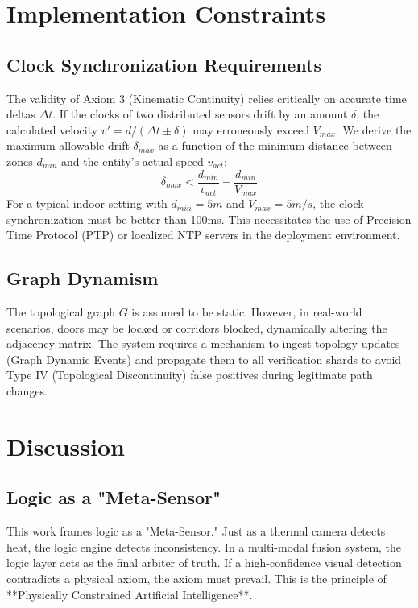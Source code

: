 \documentclass[conference]{IEEEtran}
\begin{document}
\section{Implementation Constraints}

\subsection{Clock Synchronization Requirements}
The validity of Axiom 3 (Kinematic Continuity) relies critically on accurate time deltas $\Delta t$. If the clocks of two distributed sensors drift by an amount $\delta$, the calculated velocity $v' = d / (\Delta t \pm \delta)$ may erroneously exceed $V_{max}$.
We derive the maximum allowable drift $\delta_{max}$ as a function of the minimum distance between zones $d_{min}$ and the entity's actual speed $v_{act}$:
\begin{equation}
\delta_{max} < \frac{d_{min}}{v_{act}} - \frac{d_{min}}{V_{max}}
\end{equation}
For a typical indoor setting with $d_{min}=5m$ and $V_{max}=5m/s$, the clock synchronization must be better than 100ms. This necessitates the use of Precision Time Protocol (PTP) or localized NTP servers in the deployment environment.

\subsection{Graph Dynamism}
The topological graph $G$ is assumed to be static. However, in real-world scenarios, doors may be locked or corridors blocked, dynamically altering the adjacency matrix. The system requires a mechanism to ingest topology updates (Graph Dynamic Events) and propagate them to all verification shards to avoid Type IV (Topological Discontinuity) false positives during legitimate path changes.

\section{Discussion}

\subsection{Logic as a "Meta-Sensor"}
This work frames logic as a "Meta-Sensor." Just as a thermal camera detects heat, the logic engine detects inconsistency. In a multi-modal fusion system, the logic layer acts as the final arbiter of truth. If a high-confidence visual detection contradicts a physical axiom, the axiom must prevail. This is the principle of **Physically Constrained Artificial Intelligence**.
\end{document}
